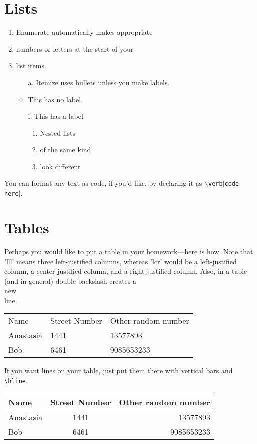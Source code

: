 \documentclass[11pt]{article}			%
\begin{document}
\section{Lists}

\begin{enumerate}
 \item Enumerate automatically makes appropriate
 \item numbers or letters at the start of your
 \item list items.
	\begin{itemize}
	\item[a.] Itemize uses bullets unless you make labels.
	\item This has no label.
	\item[i.] This has a label. \begin{enumerate}
	       \item Nested lists
		\item of the same kind
		\item look different
	      \end{enumerate}

       \end{itemize}

\end{enumerate}

You can format any text as code, if you'd like, by declaring it as $\backslash$\verb|verb|$\mid$\verb|code here|$\mid$.


\section{Tables}
Perhaps you would like to put a table in your homework---here is how.  Note that 'lll' means three left-justified columns, whereas 'lcr' would be a left-justified column, a center-justified column, and a right-justified column.  Also, in a table (and in general) double backslash creates a \\new \\line.
\begin{center}
\begin{tabular}{lll}
Name & Street Number & Other random number \\ 
Anastasia & 1441 & 13577893 \\ 
Bob & 6461 & 9085653233
\end{tabular}
\end{center}
If you want lines on your table, just put them there with vertical bars and \verb|\hline|.
\begin{center}
\begin{tabular}{|l|c||r|}
\hline
Name & Street Number & Other random number \\ 
\hline
Anastasia & 1441 & 13577893 \\ 
\hline
Bob & 6461 & 9085653233\\
\hline
\end{tabular}
\end{center}
\end{document}
